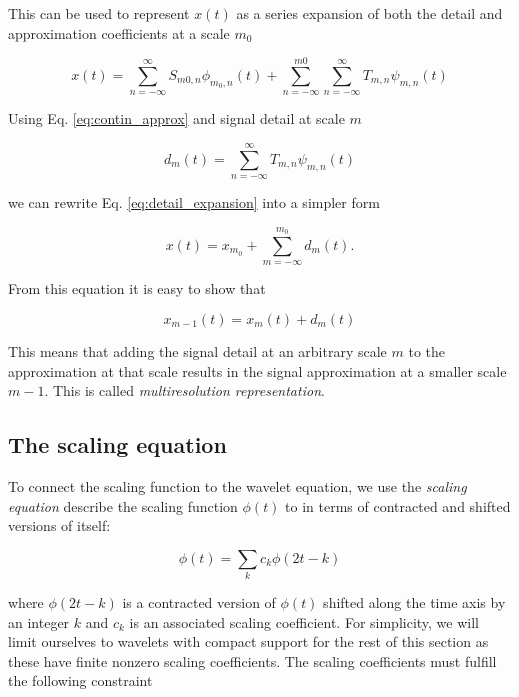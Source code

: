 This can be used to represent $x(t)$ as a series expansion of both the detail and approximation coefficients at a scale $m_0$ 

\begin{equation}
    x(t) = \sum_{n=-\infty}^{\infty} S_{m0, n} \phi_{m_0, n}(t) + \sum_{n=-\infty}^{m0} \sum_{n=-\infty}^{\infty} T_{m, n} \psi_{m, n}(t)
    \label{eq:detail_expansion}
\end{equation}

Using Eq. \ref{eq:contin_approx} and signal detail at scale $m$ 

\begin{equation}
    d_{m}(t) = \sum_{n=-\infty}^{\infty} T_{m, n} \psi_{m, n}(t)
    \label{eq:detail_scale}
\end{equation}

we can rewrite Eq. \ref{eq:detail_expansion} into a simpler form

\begin{equation}
    x(t) = x_{m_0} + \sum_{m=-\infty}^{m_0} d_m(t).
\end{equation}

From this equation it is easy to show that 

\begin{equation}
    x_{m-1}(t) = x_{m}(t) + d_m(t)
\end{equation}

This means that adding the signal detail at an arbitrary scale $m$ to the approximation at that scale results in the signal approximation at a smaller scale $m-1$.
This is called \textit{multiresolution representation}.

\subsection{The scaling equation}

To connect the scaling function to the wavelet equation, we use the \textit{scaling equation} describe the scaling function $\phi(t)$ to
in terms of contracted and shifted versions of itself:

\begin{equation}
    \phi(t) = \sum_k c_k \phi(2t - k)
    \label{eq:scal_eq}
\end{equation}

where $\phi(2t - k)$ is a contracted version of $\phi(t)$ shifted along the time axis by an integer $k$ and $c_k$ is an associated scaling coefficient. For simplicity, we 
will limit ourselves to wavelets with compact support for the rest of this section as these have finite nonzero scaling coefficients. The scaling
coefficients must fulfill the following constraint

